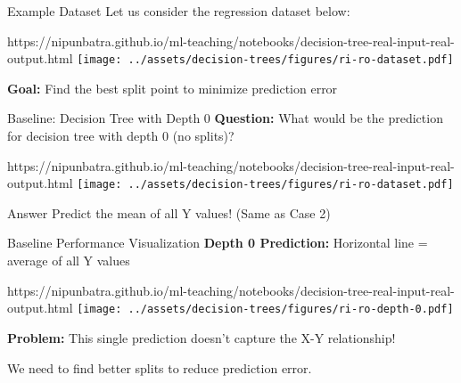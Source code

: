 \documentclass[usenames,dvipsnames]{beamer}
\begin{document}
    \begin{frame}{Example Dataset}
    Let us consider the regression dataset below:
    \begin{center}
    	\begin{notebookbox}{https://nipunbatra.github.io/ml-teaching/notebooks/decision-tree-real-input-real-output.html}
    		\texttt{[image: ../assets/decision-trees/figures/ri-ro-dataset.pdf]}
    	  \end{notebookbox}
    \end{center}
    \textbf{Goal:} Find the best split point to minimize prediction error
    \end{frame}

    \begin{frame}{Baseline: Decision Tree with Depth 0}
    \textbf{Question:} What would be the prediction for decision tree with depth 0 (no splits)?
    \begin{center}
    	\begin{notebookbox}{https://nipunbatra.github.io/ml-teaching/notebooks/decision-tree-real-input-real-output.html}
    		\texttt{[image: ../assets/decision-trees/figures/ri-ro-dataset.pdf]}
    	  \end{notebookbox}
    \end{center}
    
    \begin{keypointsbox}{Answer} 
        Predict the mean of all Y values! (Same as Case 2)
    \end{keypointsbox}
    \end{frame}

    \begin{frame}{Baseline Performance Visualization}
    \textbf{Depth 0 Prediction:} Horizontal line = average of all Y values
    \begin{center}
    	\begin{notebookbox}{https://nipunbatra.github.io/ml-teaching/notebooks/decision-tree-real-input-real-output.html}
    		\texttt{[image: ../assets/decision-trees/figures/ri-ro-depth-0.pdf]}	
    	  \end{notebookbox}
    \end{center}
    
    \textbf{Problem:} This single prediction doesn't capture the X-Y relationship!
    
    We need to find better splits to reduce prediction error.
    \end{frame}
\end{document}
